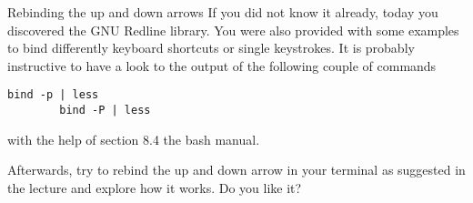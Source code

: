
\begin{exercise}[Inspirational]{Rebinding the up and down arrows}
    If you did not know it already, today you discovered the GNU Redline library.
    You were also provided with some examples to bind differently keyboard shortcuts or single keystrokes.
    It is probably instructive to have a look to the output of the following couple of commands
    \begin{lstlisting}[style=myBash]
        bind -p | less
        bind -P | less
    \end{lstlisting}
    with the help of section 8.4 the bash manual.
    
    Afterwards, try to rebind the up and down arrow in your terminal as suggested in the lecture and explore how it works.
    Do you like it?
\end{exercise}